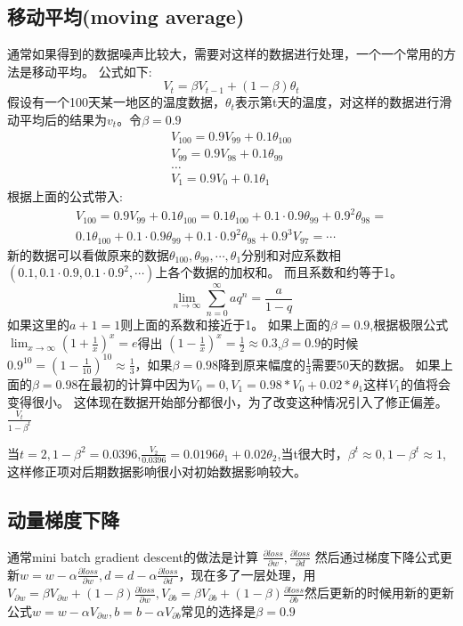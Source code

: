 \subsection{移动平均(moving average)}
通常如果得到的数据噪声比较大，需要对这样的数据进行处理，一个一个常用的方法是移动平均。
公式如下:
\begin{equation}\label{ma:1}
  V_{t} = \beta V_{t-1}  +(1-\beta)\theta_t
\end{equation}
假设有一个100天某一地区的温度数据，$\theta_t$表示第t天的温度，对这样的数据进行滑动平均后的结果为$v_{t}$。令$\beta=0.9$
\begin{align*}
  V_{100} = 0.9V_{99}+0.1\theta_{100}\\
  V_99 = 0.9V_{98}+0.1\theta_{99}\\
  \hdots\\
  V_1 = 0.9V_0+0.1\theta_{1}
\end{align*}
根据上面的公式带入:
\begin{multline*}
  V_{100}=0.9V_{99}+0.1\theta_{100}=0.1\theta_{100}+0.1\cdot0.9\theta_{99}+0.9^2\theta_{98}=\\0.1\theta_{100}+0.1\cdot0.9\theta_{99}+0.1\cdot0.9^2\theta_{98}+0.9^3V_{97}=\cdots
\end{multline*}
新的数据可以看做原来的数据$\theta_{100},\theta_{99},\cdots,\theta_{1}$分别和对应系数相$(0.1,0.1\cdot0.9,0.1\cdot0.9^2,\cdots)$上各个数据的加权和。
而且系数和约等于1。
\begin{equation}
  \lim_{n\rightarrow\infty}\sum_{n=0}^\infty aq^n=\frac{a}{1-q}
\end{equation}
如果这里的$a+1=1$则上面的系数和接近于1。
如果上面的$\beta=0.9$,根据极限公式$\lim_{x\rightarrow\infty}(1+\frac{1}{x})^{x}=e$得出
$(1-\frac{1}{x})^x=\frac{1}{2}\approx0.3$,$\beta=0.9$的时候$0.9^{10}=(1-\frac{1}{10})^{10}\approx\frac{1}{3}$，如果$\beta=0.98$降到原来幅度的$\frac{1}{3}$需要50天的数据。
如果上面的$\beta=0.98$在最初的计算中因为$V_0=0,V_1=0.98*V_0+0.02*\theta_1$这样$V_1$的值将会变得很小。
这体现在数据开始部分都很小，为了改变这种情况引入了修正偏差。
$\frac{V_t}{1-\beta^t}$

当$t=2,1-\beta^2=0.0396$,$\frac{V_2}{0.0396}=0.0196\theta_1+0.02\theta_2$,当t很大时，$\beta^t\approx0,1-\beta^t\approx1$,这样修正项对后期数据影响很小对初始数据影响较大。

\subsection{动量梯度下降}
通常mini batch gradient descent的做法是计算
$\frac{\partial loss}{\partial w},\frac{\partial loss}{\partial d}$
然后通过梯度下降公式更新$w = w-\alpha\frac{\partial loss}{\partial w},d = d-\alpha\frac{\partial loss}{\partial d}$，现在多了一层处理，用$V_{\partial w}=\beta V_{\partial w}+(1-\beta)\frac{\partial loss}{\partial w},V_{\partial b}=\beta V_{\partial b}+(1-\beta)\frac{\partial loss}{\partial b}$然后更新的时候用新的更新公式$w = w-\alpha V_{\partial w},b=b-\alpha V_{\partial b}$常见的选择是$\beta=0.9$
